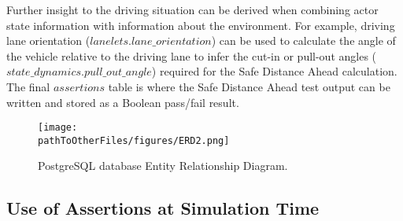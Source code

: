 Further insight to the driving situation can be derived when combining actor state information with information about the environment. For example, driving lane orientation ($lanelets.lane\_orientation$) can be used to calculate the angle of the vehicle relative to the driving lane to infer the cut-in or pull-out angles ($state\_dynamics.pull\_out\_angle$) required for the Safe Distance Ahead calculation. The final $assertions$ table is where the Safe Distance Ahead test output can be written and stored as a Boolean pass/fail result.

\begin{figure}
    \centering
    \texttt{[image: \\pathToOtherFiles/figures/ERD2.png]}
    \caption{PostgreSQL database Entity Relationship Diagram.}
    \label{fig:erd}
\end{figure}


\subsection{Use of Assertions at Simulation Time} \label{Assertions_at_Sim_Time}

